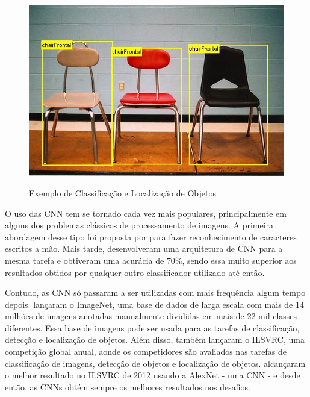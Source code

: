   \begin{figure}[H]
  \setlength{\abovecaptionskip}{0pt}
  \setlength{\belowcaptionskip}{0pt}
  \caption[Exemplo de Classificação e Localização]{Exemplo de Classificação e Localização de Objetos}
  \centering
  \includegraphics[width=.9\textwidth]{imagem/0x_classdetec.jpg}
  \captionsetup{justification=centering}
  \label{fig:exemploclassdet}
  \end{figure}

O uso das \ac{CNN} tem se tornado cada vez mais populares, principalmente em alguns dos problemas clássicos de processamento de imagens. A primeira abordagem desse tipo foi proposta por  para fazer reconhecimento de caracteres escritos a mão. Mais tarde,  desenvolveram uma arquitetura de \ac{CNN} para a mesma tarefa e obtiveram uma acurácia de $70\%$, sendo essa muito superior aos resultados obtidos por qualquer outro classificador utilizado até então.

Contudo, as \ac{CNN} só passaram a ser utilizadas com mais frequência algum tempo depois.  lançaram o ImageNet, uma base de dados de larga escala com mais de 14 milhões de imagens anotadas manualmente divididas em mais de 22 mil classes diferentes. Essa base de imagens pode ser usada para as tarefas de classificação, detecção e localização de objetos. Além disso,  também lançaram o \ac{ILSVRC}, uma competição global anual, aonde os competidores são avaliados nas tarefas de classificação de imagens, detecção de objetos e localização de objetos.  alcançaram o melhor resultado no \ac{ILSVRC} de 2012 usando a AlexNet - uma \ac{CNN} - e desde então, as \ac{CNN}s obtém sempre os melhores resultados nos desafios.

